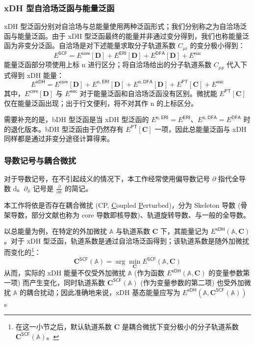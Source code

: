 \subsubsection{xDH 型自洽场泛函与能量泛函}

xDH 型泛函分别对自洽场与总能量使用两种泛函形式；我们分别称之为\textsf{自洽场泛函}与\textsf{能量泛函}。由于 xDH 型泛函最终的能量并非通过变分得到，我们也称能量泛函为非变分泛函。自洽场是对下述能量求取分子轨道系数 $C_{\mu i}$ 的变分极小得到：
\begin{equation}
  E^\textsf{SCF} = E^\textsf{core} [\mathbf{D}] + E^\textsf{ERI} [\mathbf{D}] + E^\textsf{DFA} [\mathbf{D}] + E^\textsf{nuc}
\end{equation}
能量泛函部分项使用上标 $\mathrm{n}$ 进行区分；将自洽场给出的分子轨道系数 $C_{\mu p}$ 代入下式得到 xDH 能量：
\begin{equation}
  E^\textsf{xDH} = E^\textsf{core} [\mathbf{D}] + E^{\mathrm{n}, \textsf{ERI}} [\mathbf{D}] + E^{\mathrm{n}, \textsf{DFA}} [\mathbf{D}] + E^\textsf{PT} [\mathbf{C}] + E^\textsf{nuc}
\end{equation}
其中，$E^\textsf{core} [\mathbf{D}]$ 与 $E^\textsf{nuc}$ 对于能量泛函和自洽场泛函没有区别。微扰能 $E^\textsf{PT} [\mathbf{C}]$ 仅在能量泛函出现；出于行文便利，将不对其作 $\mathrm{n}$ 的上标区分。

需要补充的是，bDH 型泛函是当 xDH 型泛函的 $E^{\mathrm{n}, \textsf{ERI}} = E^\textsf{ERI}$、$E^{\mathrm{n}, \textsf{DFA}} = E^\textsf{DFA}$ 时的退化版本。bDH 型泛函由于仍然存有 $E^\textsf{PT} [\mathbf{C}]$ 一项，因此总能量泛函与 xDH 同样都是通过非变分途径计算得来。

\subsubsection{导数记号与耦合微扰}

对于导数记号，在不引起歧义的情况下，本工作经常使用偏导数记号 $\partial$ 指代全导数 $\mathrm{d}$。$\partial_\mathbb{A}$ 记号是 $\frac{\partial}{\partial \mathbb{A}}$ 的简记。

本工作将依是否存在耦合微扰 (CP, \underline{C}oupled \underline{P}erturbed)，分为 Skeleton 导数 (骨架导数，部分文献也称为 core 导数即核导数)、轨道旋转导数、与一般的全导数。

以总能量为例，在\textsf{特定的}外加微扰 $\mathbb{A}$ 与轨道系数 $\mathbf{C}$ 下，其能量记为 $E^\textsf{xDH} (\mathbb{A}, \mathbf{C})$。对于 xDH 型泛函，轨道系数是通过自洽场泛函得到；该轨道系数是随外加微扰而变化的\footnote{在这一小节之后，默认轨道系数 $\mathbf{C}$ 是耦合微扰下变分极小的分子轨道系数 $\mathbf{C}^\textsf{SCF} (\mathbb{A})$。}：
\begin{equation*}
  \mathbf{C}^\textsf{SCF} (\mathbb{A}) = \arg \min_\mathbf{C} E^\textsf{SCF} (\mathbb{A}, \mathbf{C})
\end{equation*}
从而，实际的 xDH 能量不仅受外加微扰 $\mathbb{A}$ (作为函数 $E^\textsf{xDH} (\mathbb{A}, \mathbf{C})$ 的变量参数第一项) 而产生变化，同时轨道系数 $\mathbf{C}^\textsf{SCF} (\mathbb{A})$ (作为变量参数的第二项) 也受外加微扰 $\mathbb{A}$ 的耦合扰动；因此准确地来说，xDH \textsf{基态能量}应写为 $E^\textsf{xDH} (\mathbb{A}, \mathbf{C}^\textsf{SCF} (\mathbb{A}))$。

